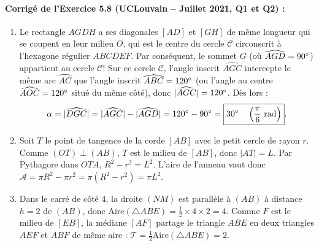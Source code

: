 \paragraph{Corrigé de l'Exercice 5.8 (UCLouvain -- Juillet 2021, Q1 et Q2) :}
\begin{enumerate}[label=(\alph*)]
    \item Le rectangle $AGDH$ a ses diagonales $[AD]$ et $[GH]$ de même longueur qui se coupent en leur milieu $O$, qui est le centre du cercle $\mathcal{C}$ circonscrit à l'hexagone régulier $ABCDEF$. Par conséquent, le sommet $G$ (où $\widehat{AGD} = 90\degree$) appartient au cercle $\mathcal{C}$! Sur ce cercle $\mathcal{C}$, l'angle inscrit $\widehat{AGC}$ intercepte le même arc $\wideparen{AC}$ que l'angle inscrit $\widehat{ABC} = 120\degree$ (ou l'angle au centre $\widehat{AOC} = 120\degree$ situé du même côté), donc $|\widehat{AGC}| = 120\degree$. Dès lors :
    \[
        \alpha = |\widehat{DGC}| = |\widehat{AGC}| - |\widehat{AGD}| = 120\degree - 90\degree = \boxed{30\degree \quad \left(\frac{\pi}{6}\text{ rad}\right)}.
    \]
    \item Soit $T$ le point de tangence de la corde $[AB]$ avec le petit cercle de rayon $r$. Comme $(OT) \perp (AB)$, $T$ est le milieu de $[AB]$, donc $|AT| = L$. Par Pythagore dans $OTA$, $R^2 - r^2 = L^2$. L'aire de l'anneau vaut donc $\mathcal{A} = \pi R^2 - \pi r^2 = \pi(R^2 - r^2) = \boxed{\pi L^2}$.
    \item Dans le carré de côté $4$, la droite $(NM)$ est parallèle à $(AB)$ à distance $h = 2$ de $(AB)$, donc $\text{Aire}(\triangle ABE) = \frac{1}{2} \times 4 \times 2 = 4$. Comme $F$ est le milieu de $[EB]$, la médiane $[AF]$ partage le triangle $ABE$ en deux triangles $AEF$ et $ABF$ de même aire : $\mathcal{T} = \frac{1}{2}\text{Aire}(\triangle ABE) = \boxed{2}$.
\end{enumerate}

